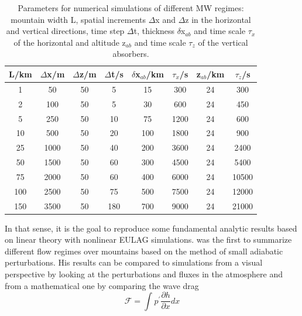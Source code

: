 \begin{table}[ht]
\centering
\caption{Parameters for numerical simulations of different MW regimes: mountain width L, spatial increments $\Delta$x and $\Delta$z in the horizontal and vertical directions, time step $\Delta$t, thickness $\delta$x$_{ab}$ and time scale $\tau_x$ of the horizontal and altitude z$_{ab}$ and time scale $\tau_z$ of the vertical absorbers.}

\begin{tabular}{@{}cccccccc@{}}
\toprule
L/km & $\Delta$x/m & $\Delta$z/m & $\Delta$t/s & $\delta$x$_{ab}$/km & $\tau_x$/s  & z$_{ab}$/km & $\tau_z$/s \\ \midrule[1pt]

1   & 50  & 50 & 5   & 15  & 300  & 24 & 300   \\
2   & 100  & 50 & 5   & 30  & 600  & 24 & 450   \\
5   & 250  & 50 & 10  & 75  & 1200 & 24 & 600  \\
10  & 500 & 50 & 20  & 100 & 1800 & 24 & 900  \\
25  & 1000 & 50 & 40  & 200 & 3600 & 24 & 2400  \\
50  & 1500 & 50 & 60  & 300 & 4500 & 24 & 5400  \\
75  & 2000 & 50 & 60  & 400 & 6000 & 24 & 10500 \\
100 & 2500 & 50 & 75  & 500 & 7500 & 24 & 12000 \\
150 & 3500 & 50 & 180 & 700 & 9000 & 24 & 21000 \\

\bottomrule
\end{tabular}
\label{tab:linearRegimes}
\end{table}

In that sense, it is the goal to reproduce some fundamental analytic results based on linear theory with nonlinear EULAG simulations. \textcite{queney_problem_1948} was the first to summarize different flow regimes over mountains based on the method of small adiabatic perturbations. His results can be compared to simulations from a visual perspective by looking at the perturbations and fluxes in the atmosphere and from a mathematical one by comparing the wave drag
%
\begin{equation}
    \mathcal{F} = \int_{}^{} p^{'} \frac{\partial h}{\partial x} dx
    \label{equ:waveDrag}
\end{equation}


